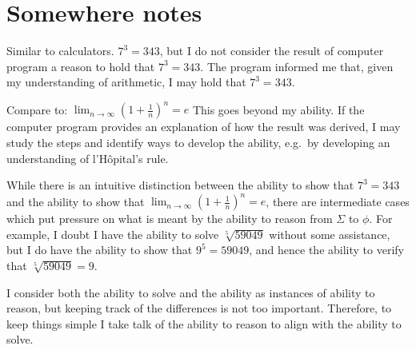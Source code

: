 \documentclass[10pt]{article}
\begin{document}
\section{Somewhere notes}
\label{sec:somewhere-notes}

\begin{note}
  Similar to calculators.
  \(7^{3} = 343\), but I do not consider the result of computer program a reason to hold that \(7^{3} = 343\).
  The program informed me that, given my understanding of arithmetic, I may hold that \(7^{3} = 343\).

  Compare to:
  \(\lim_{n \to \infty}\left(1 + \frac{1}{n} \right)^{n} = e\)
  This goes beyond my ability.
  If the computer program provides an explanation of how the result was derived, I may study the steps and identify ways to develop the ability, e.g.\ by developing an understanding of l'H\^{o}pital's rule.

  While there is an intuitive distinction between the ability to show that \(7^{3} = 343\) and the ability to show that \(\lim_{n \to \infty}\left(1 + \frac{1}{n} \right)^{n} = e\), there are intermediate cases which put pressure on what is meant by the ability to reason from \(\Sigma\) to \(\phi\).
  For example, I doubt I have the ability to solve \(\sqrt[5]{59049}\) without some assistance, but I do have the ability to show that \(9^{5} = 59049\), and hence the ability to verify that \(\sqrt[5]{59049} = 9\).

  I consider both the ability to solve and the ability as instances of ability to reason, but keeping track of the differences is not too important.
  Therefore, to keep things simple I take talk of the ability to reason to align with the ability to solve.
\end{note}
\end{document}
